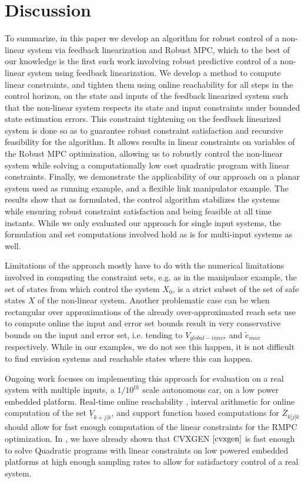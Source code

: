 \section{Discussion}
\label{sec:discussion}
To summarize, in this paper we develop an algorithm for robust control of a non-linear system via feedback linearization and Robust MPC, which to the best of our knowledge is the first such work involving robust predictive control of a non-linear system using feedback linearization. We develop a method to compute linear constraints, and tighten them using online reachability for all steps in the control horizon, on the state and inputs of the feedback linearized system such that the non-linear system respects its state and input constraints under bounded state estimation errors. This constraint tightening on the feedback linearized system is done so as to guarantee robust constraint satisfaction and recursive feasibility for the algorithm. It allows results in linear constraints on variables of the Robust MPC optimization, allowing us to robustly control the non-linear system while solving a computationally low cost quadratic program with linear constraints. Finally, we demonstrate the applicability of our approach on a planar system used as running example, and a flexible link manipulator example. The results show that as formulated, the control algorithm stabilizes the systems while ensuring robust constraint satisfaction and being feasible at all time instants. While we only evaluated our approach for single input systems, the formulation and set computations involved hold as is for multi-input systems as well.


Limitations of the approach mostly have to do with the numerical limitations involved in computing the constraint sets, e.g. as in the manipulaor example, the set of states from which control the system $X_0$, is a strict subset of the set of safe states $X$ of the non-linear system. Another problematic case can be when rectangular over approximations of the already over-approximated reach sets use to compute online the input and error set bounds result in very conservative bounds on the input and error set, i.e. tending to $V_{global-inner}$ and $\tilde{e}_{max}$ respectively. While in our examples, we do not see this happen, it is not difficult to find envision systems and reachable states where this can happen. 


Ongoing work focuses on implementing this approach for evaluation on a real system with multiple inputs, a $1/10^{th}$ scale autonomous car, on a low power embedded platform. Real-time online reachability \cite{rtreach}, interval arithmetic for online computation of the set $\underline{V}_{k+j|k}$, and support function based computations for $\bar{Z}_{k|j|k}$ should allow for fast enough computation of the linear constraints for the RMPC optimization. In \cite{PantAMNDM15_Anytime}, we have already shown that CVXGEN $\cite{cvxgen}$ is fast enough to solve Quadratic programs with linear constraints on low powered embedded platforms at high enough sampling rates to allow for satisfactory control of a real system.


